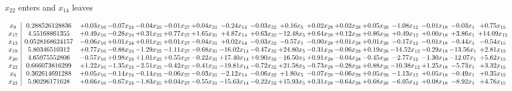 \documentclass[9pt]{article}
\begin{document}
 $ x_{22} $ enters and $ x_{14} $ leaves 

 \[\begin{array}{c| c c@{\hskip 2pt} c@{\hskip 2pt} c@{\hskip 2pt} c@{\hskip 2pt} c@{\hskip 2pt} c@{\hskip 2pt} c@{\hskip 2pt} c@{\hskip 2pt} c@{\hskip 2pt} c@{\hskip 2pt} c@{\hskip 2pt} c@{\hskip 2pt} c@{\hskip 2pt} c@{\hskip 2pt} c@{\hskip 2pt} }
 x_{8}   &  0.288526128836 & +  0.03 x_{16} & -0.07 x_{24} & -0.04 x_{25} & -0.01 x_{27} & +  0.04 x_{31} & -0.24 x_{14} & -0.03 x_{32} & +  0.16 x_{5} & +  0.02 x_{29} & +  0.02 x_{28} & +  0.05 x_{26} & -1.08 x_{12} & -0.01 x_{18} & -0.03 x_{1} & +  0.75 x_{15}\\
 x_{17}   &  4.55168861355 & +  0.49 x_{16} & -0.28 x_{24} & +  0.31 x_{25} & +  0.77 x_{27} & +  1.65 x_{31} & +  4.87 x_{14} & +  0.63 x_{32} & -12.48 x_{5} & +  0.64 x_{29} & +  0.12 x_{28} & +  0.86 x_{26} & +  0.49 x_{12} & +  0.00 x_{18} & +  3.86 x_{1} & + 14.09 x_{15}\\
 x_{13}   &  0.0528168624157 & -0.06 x_{16} & +  0.01 x_{24} & +  0.01 x_{25} & +  0.01 x_{27} & -0.04 x_{31} & +  0.02 x_{14} & -0.03 x_{32} & -0.57 x_{5} & -0.00 x_{29} & +  0.01 x_{28} & +  0.01 x_{26} & -0.17 x_{12} & -0.01 x_{18} & -0.44 x_{1} & -0.54 x_{15}\\
 x_{19}   &  5.80346510312 & +  0.77 x_{16} & -0.88 x_{24} & -1.29 x_{25} & -1.11 x_{27} & -0.68 x_{31} & -16.02 x_{14} & -0.47 x_{32} & + 24.80 x_{5} & -0.31 x_{29} & -0.06 x_{28} & +  0.19 x_{26} & -14.52 x_{12} & -0.29 x_{18} & -13.56 x_{1} & +  2.81 x_{15}\\
 x_{20}   &  4.65975552806 & -0.57 x_{16} & +  0.98 x_{24} & +  1.01 x_{25} & +  0.55 x_{27} & -0.22 x_{31} & + 17.40 x_{14} & +  0.90 x_{32} & -16.50 x_{5} & +  0.91 x_{29} & -0.04 x_{28} & -0.45 x_{26} & -2.77 x_{12} & -1.30 x_{18} & -12.07 x_{1} & +  5.62 x_{15}\\
 x_{22}   &  0.666073816299 & +  1.22 x_{16} & -1.35 x_{24} & -2.51 x_{25} & -0.42 x_{27} & -0.41 x_{31} & -19.81 x_{14} & -0.72 x_{32} & + 21.58 x_{5} & -0.73 x_{29} & -0.28 x_{28} & +  0.88 x_{26} & -10.38 x_{12} & +  1.25 x_{18} & -5.73 x_{1} & +  3.32 x_{15}\\
 x_{6}   &  0.362614691288 & +  0.05 x_{16} & -0.14 x_{24} & -0.14 x_{25} & -0.06 x_{27} & -0.03 x_{31} & -2.12 x_{14} & -0.06 x_{32} & +  1.80 x_{5} & -0.07 x_{29} & -0.06 x_{28} & +  0.05 x_{26} & -1.13 x_{12} & +  0.05 x_{18} & -0.49 x_{1} & +  0.35 x_{15}\\
 x_{23}   &  5.90296171628 & +  0.66 x_{16} & -0.67 x_{24} & -1.83 x_{25} & +  0.04 x_{27} & -0.55 x_{31} & -15.63 x_{14} & -0.22 x_{32} & + 15.93 x_{5} & +  0.31 x_{29} & -0.64 x_{28} & +  0.68 x_{26} & -6.05 x_{12} & +  0.08 x_{18} & -8.92 x_{1} & +  4.76 x_{15}\\

\end{array}\]
\end{document}
